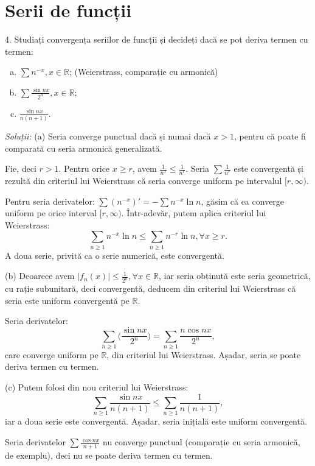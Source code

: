 \documentclass[11pt,a4paper]{article}
\newcommand\RR{\mathbb{R}}
\theoremstyle{dotless}
\theoremstyle{dotlessdr}
\begin{document}
\section{Serii de funcții}
\label{sec:serii-f}

4. Studiați convergența seriilor de funcții și decideți dacă se pot deriva
termen cu termen:
\begin{enumerate}[(a)]
\item $\sum n^{-x}, x \in \RR$; (Weierstrass, comparație cu armonică)
\item $\sum \frac{\sin nx}{2^n}, x \in \RR$;
\item $\frac{\sin nx}{n(n+1)}$.
\end{enumerate}

\emph{Soluții:}
(a) Seria converge punctual dacă și numai dacă $x > 1$, pentru că poate fi
comparată cu seria armonică generalizată.

Fie, deci $r > 1$. Pentru orice $x \geq r$, avem $\frac{1}{n^x} \leq \frac{1}{n^r}$.
Seria $\sum \frac{1}{n^r}$ este convergentă și rezultă din criteriul lui
Weierstrass că seria converge uniform pe intervalul $[r, \infty)$.

Pentru seria derivatelor: $\sum (n^{-x})' = -\sum n^{-x} \ln n$, găsim că ea
converge uniform pe orice interval $[r, \infty)$. Într-adevăr, putem aplica
criteriul lui Weierstrass:
\[
  \sum_{n \geq 1} n^{-x} \ln n \leq \sum_{n \geq 1} n^{-r} \ln n, \forall x \geq r.
\]
A doua serie, privită ca o serie numerică, este convergentă.

(b) Deoarece avem $|f_n(x)| \leq \frac{1}{2^n}, \forall x \in \RR$, iar seria
obținută este seria geometrică, cu rație subunitară, deci convergentă, deducem
din criteriul lui Weierstrass că seria este uniform convergentă pe $\RR$.

Seria derivatelor:
\[
  \sum_{n \geq 1} \Big( \frac{\sin nx}{2^n} \Big) = %
  \sum_{n \geq 1} \frac{n \cos nx}{2^n},
\]
care converge uniform pe $\RR$, din criteriul lui Weierstrass. Așadar, seria se
poate deriva termen cu termen.

(c) Putem folosi din nou criteriul lui Weierstrass:
\[
  \sum_{n \geq 1} \frac{\sin nx}{n(n + 1)} \leq %
  \sum_{n \geq 1} \frac{1}{n(n+1)},
\]
iar a doua serie este convergentă. Așadar, seria inițială este uniform convergentă.

Seria derivatelor $\sum \frac{\cos nx}{n + 1}$ nu converge punctual (comparație
cu seria armonică, de exemplu), deci nu se poate deriva termen cu termen.

\vspace{1cm}
\end{document}
